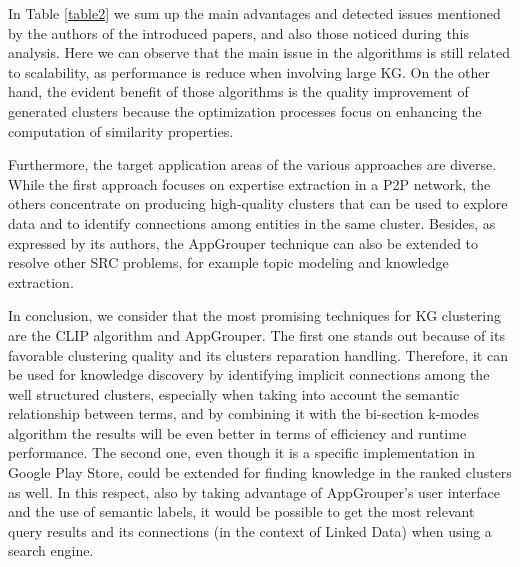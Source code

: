 \documentclass[runningheads]{llncs}
\begin{document}
\medskip In Table \ref{table2} we sum up the main advantages and detected issues mentioned by the authors of the introduced papers, and also those noticed during this analysis. Here we can observe that the main issue in the algorithms is still related to scalability, as performance is reduce when involving large KG. On the other hand, the evident benefit of those algorithms is the quality improvement of generated clusters because the optimization processes focus on enhancing the computation of similarity properties.

Furthermore, the target application areas of the various approaches are diverse. While the first approach focuses on expertise extraction in a P2P network, the others concentrate on producing high-quality clusters that can be used to explore data and to identify connections among entities in the same cluster. Besides, as expressed by its authors, the AppGrouper technique can also be extended to resolve other SRC problems, for example topic modeling and knowledge extraction.

In conclusion, we consider that the most promising techniques for KG clustering are the CLIP algorithm and AppGrouper. The first one stands out because of its favorable clustering quality and its clusters reparation handling. Therefore, it can be used for knowledge discovery by identifying implicit connections among the well structured clusters, especially when taking into account the semantic relationship between terms, and by combining it with the bi-section k-modes algorithm the results will be even better in terms of efficiency and runtime performance. The second one, even though it is a specific implementation in Google Play Store, could be extended for finding knowledge in the ranked clusters as well. In this respect, also by taking advantage of AppGrouper's user interface and the use of semantic labels, it would be possible to get the most relevant query results and its connections (in the context of Linked Data) when using a search engine.
\end{document}
